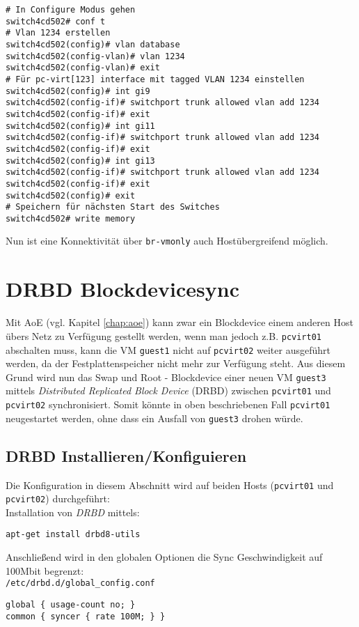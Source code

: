 \setupVerbatimOut
\begin{verbatim}
# In Configure Modus gehen
switch4cd502# conf t
# Vlan 1234 erstellen
switch4cd502(config)# vlan database 
switch4cd502(config-vlan)# vlan 1234
switch4cd502(config-vlan)# exit
# Für pc-virt[123] interface mit tagged VLAN 1234 einstellen 
switch4cd502(config)# int gi9 
switch4cd502(config-if)# switchport trunk allowed vlan add 1234
switch4cd502(config-if)# exit
switch4cd502(config)# int gi11
switch4cd502(config-if)# switchport trunk allowed vlan add 1234
switch4cd502(config-if)# exit
switch4cd502(config)# int gi13
switch4cd502(config-if)# switchport trunk allowed vlan add 1234
switch4cd502(config-if)# exit
switch4cd502(config)# exit
# Speichern für nächsten Start des Switches
switch4cd502# write memory
\end{verbatim}

Nun ist eine Konnektivität über \verb#br-vmonly# auch Hostübergreifend möglich.

\chapter{DRBD Blockdevicesync}

Mit AoE (vgl. Kapitel \ref{chap:aoe}) kann zwar ein Blockdevice einem anderen Host übers Netz zu Verfügung gestellt werden, wenn man jedoch z.B. \verb#pcvirt01# abschalten muss, kann die VM \verb#guest1# nicht auf \verb#pcvirt02# weiter ausgeführt werden, da der Festplattenspeicher nicht mehr zur Verfügung steht. Aus diesem Grund wird nun das Swap und Root - Blockdevice einer neuen VM \verb#guest3# mittels \emph{Distributed Replicated Block Device} (DRBD) zwischen \verb#pcvirt01# und \verb#pcvirt02# synchronisiert. Somit könnte in oben beschriebenen Fall \verb#pcvirt01# neugestartet werden, ohne dass ein Ausfall von \verb#guest3# drohen würde.

\section{DRBD Installieren/Konfiguieren}
Die Konfiguration in diesem Abschnitt wird auf beiden Hosts (\verb#pcvirt01# und \verb#pcvirt02#) durchgeführt: 
\\
Installation von \emph{DRBD} mittels: 
\setupVerbatimOut
\begin{verbatim}
apt-get install drbd8-utils
\end{verbatim}

Anschließend wird in den globalen Optionen die Sync Geschwindigkeit auf 100Mbit begrenzt:
\\
\verb|/etc/drbd.d/global_config.conf|
\setupVerbatimOut
\begin{verbatim}
global { usage-count no; }
common { syncer { rate 100M; } }
\end{verbatim}

